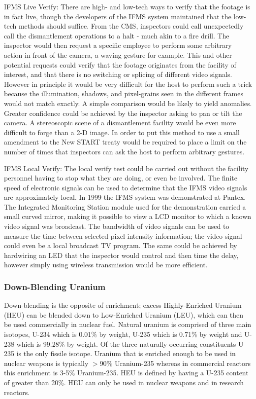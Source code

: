 \documentclass[twoside,titlepage,11pt,twocolumn,a4paper]{article}
\begin{document}
IFMS Live Verify: There are high- and low-tech ways to verify 
that the footage is in fact live, though the developers of the 
IFMS system maintained that the low-tech methods should suffice. 
From the CMS, inspectors could call unexpectedly call the 
dismantlement operations to a halt - much akin to a fire drill. 
The inspector would then request a specific employee to perform 
some arbitrary action in front of the camera, a waving gesture 
for example. This and other potential requests could verify that 
the footage originates from the facility of interest, and that 
there is no switching or splicing of different video signals. 
However in principle it would be very difficult for the host 
to perform such a trick because the illumination, shadows, 
and pixel-grains seen in the different frames would not match 
exactly. A simple comparison would be likely to yield anomalies. 
Greater confidence could be achieved by the inspector asking 
to pan or tilt the camera. A stereoscopic scene of a dismantlement 
facility would be even more difficult to forge than a 2-D image.  
In order to put this method to use a small amendment to the New 
START treaty would be required to place a limit on the number 
of times that inspectors can ask the host to perform arbitrary 
gestures. 

IFMS Local Verify: The local verify test could be carried out 
without the facility personnel having to stop what they are 
doing, or even be involved. The finite speed of electronic 
signals can be used to determine that the IFMS video signals 
are approximately local. In 1999 the IFMS system was 
demonstrated at Pantex. The Integrated Monitoring Station 
module used for the demonstration carried a small curved 
mirror, making it possible to view a LCD monitor to which 
a known video signal was broadcast. The bandwidth of video 
signals can be used to measure the time between selected
pixel intensity information; the video signal could even 
be a local broadcast TV program. The same could be achieved 
by hardwiring an LED that the inspector would control and 
then time the delay, however simply using wireless 
transmission would be more efficient. \citep{gerdes2001}

\subsubsection{Down-Blending Uranium}
Down-blending is the opposite of enrichment; excess Highly-Enriched
Uranium (HEU) can be blended down to Low-Enriched Uranium (LEU), which
can then be used commercially in nuclear fuel. Natural uranium is
comprised of three main isotopes, U-234 which is 0.01\% by weight,
U-235 which is 0.71\% by weight and U-238 which is 99.28\% by weight.
Of the three naturally occurring constituents U-235 is the only
fissile isotope.  Uranium that is enriched enough to be used in
nuclear weapons is typically \(>\)90\% Uranium-235 whereas in
commercial reactors this enrichment is 3-5\% Uranium-235.  HEU is
defined by having a U-235 content of greater than 20\%. HEU can only
be used in nuclear weapons and in research reactors.
\end{document}
